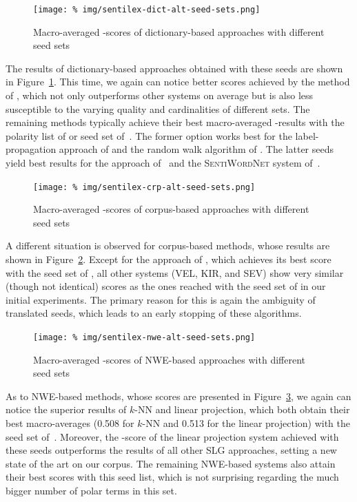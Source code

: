 \begin{figure}[hbtp]
  \centering
  \texttt{[image: \%
    img/sentilex-dict-alt-seed-sets.png]}
  \caption{Macro-averaged \F{}-scores of dictionary-based approaches
    with different seed sets}\label{snt:fig:sent-dict-lex-alt-seeds}
\end{figure}

The results of dictionary-based approaches obtained with these seeds
are shown in Figure~\ref{snt:fig:sent-dict-lex-alt-seeds}.  This time,
we again can notice better scores achieved by the method of
\citet{Blair-Goldensohn:08}, which not only outperforms other systems
on average but is also less susceptible to the varying quality and
cardinalities of different sets.  The remaining methods typically
achieve their best macro-averaged \F{}-results with the polarity list
of \citet{Kim:04} or seed set of~\citet{Esuli:06c}.  The former option
works best for the label-propagation approach of \citet{Rao:09} and
the random walk algorithm of \citet{Awadallah:10}.  The latter seeds
yield best results for the approach of~\citet{Hu:04} and the
\textsc{SentiWordNet} system of~\citet{Esuli:06c}.

\begin{figure}[hbtp]
  \centering
  \texttt{[image: \%
    img/sentilex-crp-alt-seed-sets.png]}
  \caption{Macro-averaged \F{}-scores of corpus-based approaches with
    different seed sets}\label{snt:fig:sent-crp-lex-alt-seeds}
\end{figure}

A different situation is observed for corpus-based methods, whose
results are shown in Figure~\ref{snt:fig:sent-crp-lex-alt-seeds}.
Except for the approach of \citet{Takamura:05}, which achieves its
best score with the seed set of \citet{Hu:04}, all other systems (VEL,
KIR, and SEV) show very similar (though not identical) scores as the
ones reached with the seed set of \citet{Turney:03} in our initial
experiments.  The primary reason for this is again the ambiguity of
translated seeds, which leads to an early stopping of these
algorithms.

\begin{figure}[hbtp]
  \centering
  \texttt{[image: \%
    img/sentilex-nwe-alt-seed-sets.png]}
  \caption{Macro-averaged \F{}-scores of NWE-based approaches with
    different seed sets}\label{snt:fig:sent-nwe-lex-alt-seeds}
\end{figure}

As to NWE-based methods, whose scores are presented in
Figure~\ref{snt:fig:sent-nwe-lex-alt-seeds}, we again can notice the
superior results of $k$-NN and linear projection, which both obtain
their best macro-averages (0.508 for $k$-NN and 0.513 for the linear
projection) with the seed set of~\citet{Kim:04}. Moreover, the
\F{}-score of the linear projection system achieved with these seeds
outperforms the results of all other SLG approaches, setting a new
state of the art on our corpus.  The remaining NWE-based systems also
attain their best scores with this seed list, which is not surprising
regarding the much bigger number of polar terms in this set.

